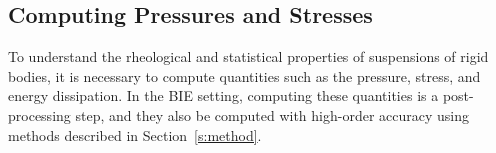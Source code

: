 \documentclass[preprint, 10pt]{elsarticle}
\begin{document}

\subsection{Computing Pressures and Stresses}
To understand the rheological and statistical properties of suspensions
of rigid bodies, it is necessary to compute quantities such as the
pressure, stress, and energy dissipation.  In the BIE setting, computing
these quantities is a post-processing step, and they also be
computed with high-order accuracy using methods described in
Section~\ref{s:method}.
\end{document}

